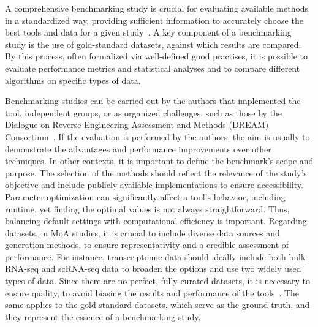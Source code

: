 A comprehensive benchmarking study is crucial for evaluating available methods in a standardized way, providing sufficient information to accurately choose the best tools and data for a given study~\cite{RN108}.
A key component of a benchmarking study is the use of gold-standard datasets, against which results are compared.
By this process, often formalized via well-defined good practises, it is possible to evaluate performance metrics and statistical analyses and to compare different algorithms on specific types of data. 

Benchmarking studies can be carried out by the authors that implemented the tool, independent groups, or as organized challenges, such as those by the Dialogue on Reverse Engineering Assessment and Methods (DREAM) Consortium~\cite{RN109}.
If the evaluation is performed by the authors, the aim is usually to demonstrate the advantages and performance improvements over other techniques.
In other contexts, it is important to define the benchmark's scope and purpose.
The selection of the methods should reflect the relevance of the study's objective and include publicly available implementations to ensure accessibility.
Parameter optimization can significantly affect a tool's behavior, including runtime, yet finding the optimal values is not always straightforward.
Thus, balancing default settings with computational efficiency is important.
Regarding datasets, in \gls{MoA} studies, it is crucial to include diverse data sources and generation methods, to ensure representativity and a credible assessment of performance.
For instance, transcriptomic data should ideally include both bulk \gls{RNA-seq} and \gls{scRNA-seq} data to broaden the options and use two widely used types of data.
Since there are no perfect, fully curated datasets, it is necessary to ensure quality, to avoid biasing the results and performance of the tools~\cite{RN109}.
The same applies to the gold standard datasets, which serve as the ground truth, and they represent the essence of a benchmarking study.

